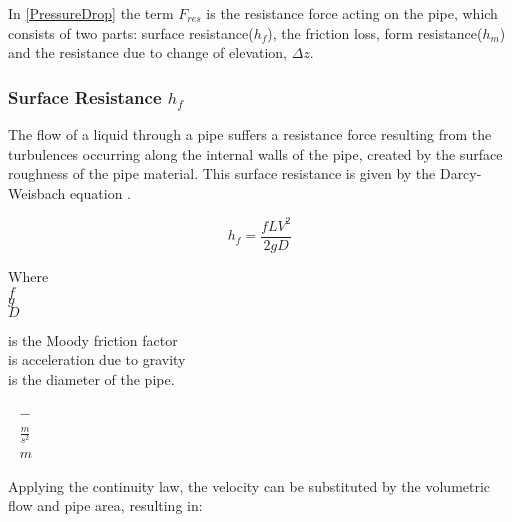 In \eqref{PressureDrop} the term $F_{res}$ is the resistance force acting on the 
pipe, which consists of two parts: surface resistance($h_{f}$), the friction 
loss, form resistance($h_{m}$) and the resistance due to change of elevation, $\Delta z$. 

\subsubsection{Surface Resistance \texorpdfstring{$h_f$}{}} 

The flow of a liquid through a pipe suffers a resistance force resulting from 
the turbulences occurring along the internal walls of the pipe, created by the surface roughness of the pipe material. This surface 
resistance is given by the Darcy-Weisbach equation \cite{Design_Water}.

\begin{equation}
  h_f = \frac{fLV^2}{2gD}
  \label{Darcy}
\end{equation}

 \begin{minipage}[t]{0.20\textwidth}
Where\\
\hspace*{8mm} $f$ \\
\hspace*{8mm} $g$ \\
\hspace*{8mm} $D$ 
\end{minipage}
\begin{minipage}[t]{0.68\textwidth}
\vspace*{2mm}
is the Moody friction factor\\ 
is acceleration due to gravity\\
is the diameter of the pipe.

\end{minipage}
\begin{minipage}[t]{0.10\textwidth}
\vspace*{2mm}
\textcolor{White}{te}$\unit{-}$\\
\textcolor{White}{te}$\unit{\frac{m}{s^2}}$\\
\textcolor{White}{te}$\unit{m}$
\end{minipage}

Applying the continuity law, the velocity can be substituted by the volumetric flow and pipe area, resulting in:

